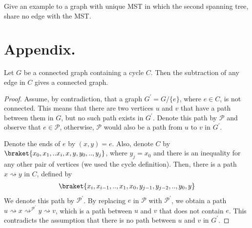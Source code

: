 \begin{problem}
  Give an example to a graph with unique MST in which the second spanning tree, share no edge with the MST. 
\end{problem}

\section{Appendix.}

\begin{claim}
  \label{claim:subtract}
  Let $G$ be a connected graph containing a cycle $C$. Then the subtraction of any edge in $C$ gives a connected graph. 
\end{claim}
\begin{proof}
Assume, by contradiction, that a graph $G^{\prime} = G / \{ e \} $, where $e \in C$, is not connected. This means that there are two vertices $u$ and $v$ that have a path between them in $G$, but no such path exists in $G^{\prime}$. Denote this path by $\mathcal{P}$ and observe that $e \in \mathcal{P}$, otherwise, $\mathcal{P}$ would also be a path from $u$ to $v$ in $G^{\prime}$.

Denote the ends of $e$ by $(x,y)=e$. Also, denote $C$ by $\braket{x_{0},x_{1},..x_{i},x,y,y_{0},..,y_{j}}$, where $y_{j}=x_{0}$ and there is an inequality for any other pair of vertices (we used the cycle definition). Then, there is a path $x \rightsquigarrow y$ in $C$, defined by 
\begin{equation*}
  \begin{split}
\braket{x_{i},x_{i-1},..,x_{1},x_{0},y_{j-1},y_{j-2},..,y_{0},y}
  \end{split}
\end{equation*}
 We denote this path by $\mathcal{P}^{\prime}$. By replacing $e$ in $\mathcal{P}$ with $\mathcal{P}^{\prime}$, we obtain a path $u \rightsquigarrow x \rightsquigarrow^{\mathcal{P}^\prime} y \rightsquigarrow v$, which is a path between $u$ and $v$ that does not contain $e$. This contradicts the assumption that there is no path between $u$ and $v$ in $G^{\prime}$.
\end{proof}







